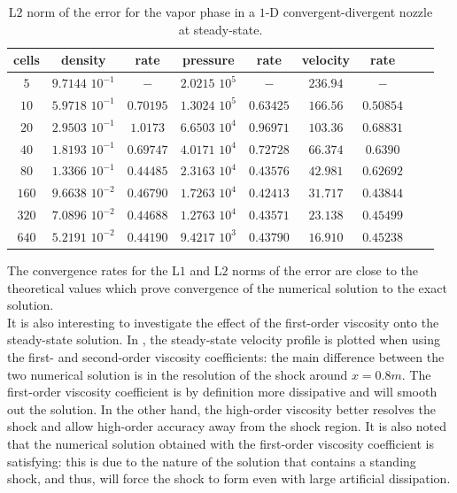 \begin{table}[H]
\begin{center}
 \caption{\label{tbl:l2_norm_vap} L$2$ norm of the error for the vapor phase in a $1$-D convergent-divergent nozzle at steady-state.}
 \begin{tabular}{|c|c|c|c|c|c|c|c|c|}
 \hline
   cells & density & rate & pressure & rate & velocity & rate \\
 \hline
$5$ &   $9.7144$ $10^{-1}$ & $-$ & $2.0215$ $10^{5}$ & $-$ & $236.94$                   & $-$\\
  \hline
$10$  &  $5.9718$ $10^{-1}$ & $0.70195$ & $1.3024$ $10^{5}$ & $0.63425$ & $166.56$ & $0.50854$\\
   \hline
$20$ & $2.9503$ $10^{-1}$ & $1.0173$ & $6.6503$ $10^{4}$ & $0.96971$ & $103.36$& $0.68831$\\
 \hline
$40$ & $1.8193$ $10^{-1}$ & $0.69747$ & $4.0171$ $10^{4}$ & $0.72728$ & $66.374$& $0.6390$\\
 \hline
$80$ & $1.3366$ $10^{-1}$ & $0.44485$ & $2.3163$ $10^{4}$ & $0.43576$ & $42.981$& $0.62692$\\
 \hline
$160$&$9.6638$ $10^{-2}$ & $0.46790$ & $1.7263$ $10^{4}$ & $0.42413$ & $31.717$& $0.43844$\\
 \hline
$320$&$7.0896$ $10^{-2}$& $0.44688$ & $1.2763$ $10^{4}$ & $0.43571$ & $23.138$& $0.45499$\\
 \hline
 $640$&$5.2191$ $10^{-2}$& $0.44190$ & $9.4217$ $10^{3}$ & $0.43790$ & $16.910$& $0.45238$\\
 \hline
\end{tabular}
\end{center}
\nonumber
\end{table}
The convergence rates for the L$1$ and L$2$ norms of the error are close to the theoretical values which prove convergence of the numerical solution to the exact solution.\\
It is also interesting to investigate the effect of the first-order viscosity onto the steady-state solution. In , the steady-state velocity profile is plotted when using the first- and second-order viscosity coefficients: the main difference between the two numerical solution is in the resolution of the shock around $x=0.8m$. The first-order viscosity coefficient is by definition more dissipative and will smooth out the solution. In the other hand, the high-order viscosity better resolves the shock and allow high-order accuracy away from the shock region. It is also noted that the numerical solution obtained with the first-order viscosity coefficient is satisfying: this is due to the nature of the solution that contains a standing shock, and thus, will force the shock to form even with large artificial dissipation. 
